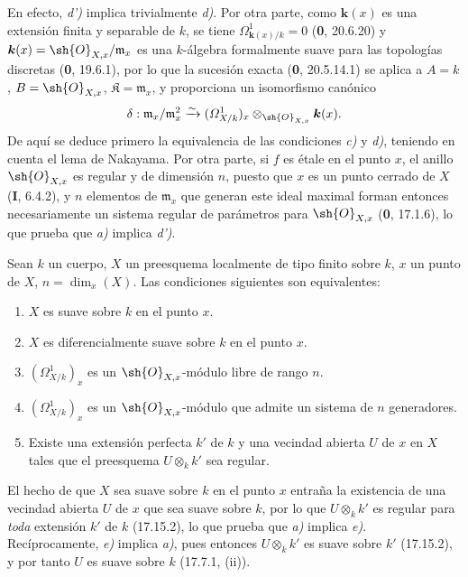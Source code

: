 En efecto, \emph{d')} implica trivialmente \emph{d)}. Por otra parte, como $\boldsymbol{k}(x)$ es una extensión finita y separable de $k$, se tiene $\Omega^1_{\mathbf{k}(x)/k}=0$ (\textbf 0, 20.6.20) y $\boldsymbol{k}(x)=\sh{O}_{X,x}/\mathfrak m_x$ es una $k$-álgebra formalmente suave para las topologías discretas (\textbf 0, 19.6.1), por lo que la sucesión exacta (\textbf 0, 20.5.14.1) se aplica a $A=k$, $B=\sh{O}_{X,x}$, $\mathfrak{K}=\mathfrak m_x$, y proporciona un isomorfismo canónico
\[
\delta:\mathfrak m_x/\mathfrak m_x^2\xrightarrow{\sim}(\varOmega^1_{X/k})_x\otimes_{\sh{O}_{X,x}}\boldsymbol{k}(x).
\]
De aquí se deduce primero la equivalencia de las condiciones \emph{c)} y \emph{d)}, teniendo en cuenta el lema de Nakayama. Por otra parte, si $f$ es étale en el punto $x$, el anillo $\sh{O}_{X,x}$ es regular y de dimensión $n$, puesto que $x$ es un punto cerrado de $X$ (\textbf I, 6.4.2), y $n$ elementos de $\mathfrak m_x$ que generan este ideal maximal forman entonces necesariamente un sistema regular de parámetros para $\sh{O}_{X,x}$ (\textbf 0, 17.1.6), lo que prueba que \emph{a)} implica \emph{d')}.

\begin{proposition}[17.15.5]
\label{IV.17.15.5}
Sean $k$ un cuerpo, $X$ un preesquema localmente de tipo finito sobre $k$, $x$ un punto de $X$, $n=\dim_x(X)$. Las condiciones siguientes son equivalentes:
\begin{enumerate}
  \item[\textup{a)}] $X$ es suave sobre $k$ en el punto $x$.
  \item[\textup{b)}] $X$ es diferencialmente suave sobre $k$ en el punto $x$.
  \item[\textup{c)}] $(\varOmega^1_{X/k})_x$ es un $\sh{O}_{X,x}$-módulo libre de rango $n$.
  \item[\textup{d)}] $(\varOmega^1_{X/k})_x$ es un $\sh{O}_{X,x}$-módulo que admite un sistema de $n$ generadores.


  \item[\textup{e)}] Existe una extensión perfecta $k'$ de $k$ y una vecindad abierta $U$ de $x$ en $X$ tales que el preesquema $U\otimes_k k'$ sea regular.
\end{enumerate}
\end{proposition}

El hecho de que $X$ sea suave sobre $k$ en el punto $x$ entraña la existencia de una vecindad abierta $U$ de $x$ que sea suave sobre $k$, por lo que $U\otimes_k k'$ es regular para \emph{toda} extensión $k'$ de $k$ (17.15.2), lo que prueba que \emph{a)} implica \emph{e)}. Recíprocamente, \emph{e)} implica \emph{a)}, pues entonces $U\otimes_k k'$ es suave sobre $k'$ (17.15.2), y por tanto $U$ es suave sobre $k$ (17.7.1, (ii)).

